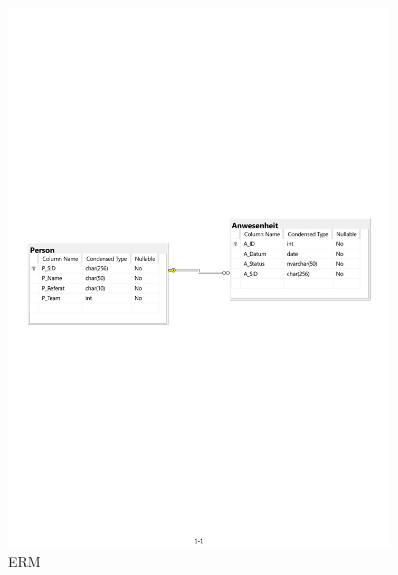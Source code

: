 \begin{figure}[htb]
    \centering
    \includegraphics[width=0.9\textwidth,angle=0]{abb/ERM.pdf}
    \caption[Beschreibung]{ERM}
    \label{abb:ERM}
\end{figure}

